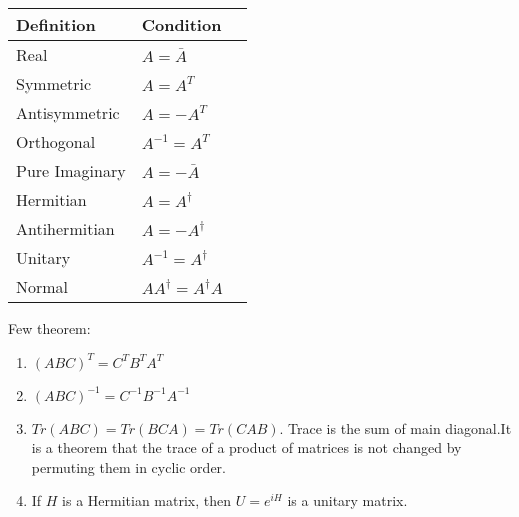 \documentclass[../main.tex]{subfiles}
\begin{document}
\begin{table}[h]
    \centering
    \begin{tabular}{@{}llr@{}} 
        \toprule
        Definition & Condition  \\ 
        \midrule
        Real & $A=\bar{A}$  \\  
        Symmetric & $A=A^T$ \\     
        Antisymmetric & $A=-A^T$ \\
        Orthogonal & $A^{-1}=A^T$ \\
        Pure Imaginary & $A=-\bar{A}$ \\
        Hermitian & $A=A^{\dagger}$ \\
        Antihermitian & $A=-A^{\dagger}$\\
        Unitary & $A^{-1}=A^{\dagger}$\\
        Normal & $AA^{\dagger}=A^{\dagger}A$\\
        \bottomrule
    \end{tabular}
\end{table}

Few theorem:
\begin{enumerate}
    \item $(ABC)^T=C^TB^TA^T$
    \item $(ABC)^{-1}=C^{-1}B^{-1}A^{-1}$
    \item $Tr(ABC)=Tr(BCA)=Tr(CAB)$.  Trace is the sum of main diagonal.It is a theorem that the
    trace of a product of matrices is not changed by permuting them in cyclic order.
    \item If $H$ is a Hermitian matrix, then $U = e^{iH}$ is a unitary matrix.
\end{enumerate}
\end{document}
